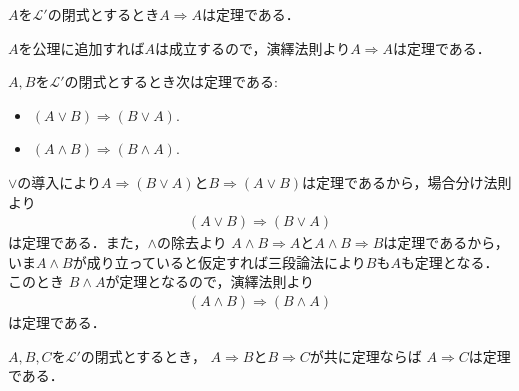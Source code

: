 	
	\begin{screen}
		\begin{metathm}[反射律]\label{metathm:reflective_law_of_implication}
			$A$を$\mathcal{L}'$の閉式とするとき$A \Longrightarrow A$は定理である．
		\end{metathm}
	\end{screen}
	
	\begin{prf}
		$A$を公理に追加すれば$A$は成立するので，演繹法則より$A \Longrightarrow A$は定理である．
		\QED
	\end{prf}
	
	\begin{screen}
		\begin{metathm}[可換律]
			$A,B$を$\mathcal{L}'$の閉式とするとき次は定理である:
			\begin{itemize}
				\item $(A \vee B) \Longrightarrow (B \vee A)$.
				\item $(A \wedge B) \Longrightarrow (B \wedge A)$.
			\end{itemize}
		\end{metathm}
	\end{screen}
	
	\begin{prf}
		$\vee$の導入により$A \Longrightarrow (B \vee A)$と$B \Longrightarrow (A \vee B)$は定理であるから，場合分け法則より
		\begin{align}
			(A \vee B) \Longrightarrow (B \vee A)
		\end{align}
		は定理である．また，$\wedge$の除去より
		$A \wedge B \Longrightarrow A$と$A \wedge B \Longrightarrow B$は定理であるから，
		いま$A \wedge B$が成り立っていると仮定すれば三段論法により$B$も$A$も定理となる．このとき
		$B \wedge A$が定理となるので，演繹法則より
		\begin{align}
			(A \wedge B) \Longrightarrow (B \wedge A)
		\end{align}
		は定理である．
		\QED
	\end{prf}
	
	\begin{screen}
		\begin{metathm}[推移律]\label{metathm:transitive_law_of_implication}
			$A,B,C$を$\mathcal{L}'$の閉式とするとき，
			$A \Longrightarrow B$と$B \Longrightarrow C$が共に定理ならば
			$A \Longrightarrow C$は定理である．
		\end{metathm}
	\end{screen}
	
